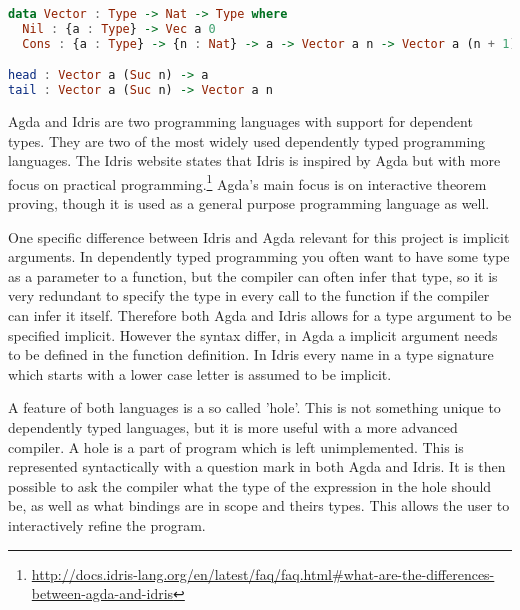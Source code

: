 \documentclass[parskip=half]{scrartcl}
\begin{document}
\begin{lstlisting}[language=Haskell,label={lst:depex},caption={ \textit{n} is a type parameter, in this case it is a natural number.  }]
data Vector : Type -> Nat -> Type where
  Nil : {a : Type} -> Vec a 0
  Cons : {a : Type} -> {n : Nat} -> a -> Vector a n -> Vector a (n + 1)

head : Vector a (Suc n) -> a
tail : Vector a (Suc n) -> Vector a n
\end{lstlisting}



Agda and Idris are two programming languages with support for dependent types.
They are two of the most widely used dependently typed programming languages.
The Idris website states that Idris is inspired
by Agda but with more focus on practical
programming.\footnote{\url{http://docs.idris-lang.org/en/latest/faq/faq.html\#what-are-the-differences-between-agda-and-idris}}
Agda's main focus is on interactive theorem proving, though it is used as
a general purpose programming language as well.

One specific difference between Idris and Agda relevant for this project is
implicit arguments. In dependently typed programming you often want to have
some type as a parameter to a function, but the compiler can often infer that
type, so it is very redundant to specify the type in every call to the function
if the compiler can infer it itself. Therefore both Agda and Idris allows for
a type argument to be specified implicit. However the syntax differ, in Agda
a implicit argument needs to be defined in the function definition. In Idris
every name in a type signature which starts with a lower case letter is assumed
to be implicit.

A feature of both languages is a so called 'hole'. This is not something unique
to dependently typed languages, but it is more useful with a more advanced
compiler. A hole is a part of program which is left unimplemented. This is
represented syntactically with a question mark in both Agda and Idris. It
is then possible to ask the compiler what the type of the expression in the
hole should be, as well as what bindings are in scope and theirs types. This
allows the user to interactively refine the program.
\end{document}
